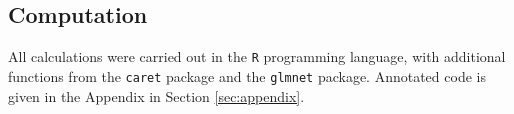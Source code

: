 \documentclass{article}\usepackage[]{graphicx}\usepackage[]{color}
\begin{document}
                                                                                                                                                                                                                                                                                                                                                                                                                                                                                                                                                                                                \subsection{Computation}
All calculations were carried out in the \texttt{R} programming language, with additional functions from the \texttt{caret} package and the \texttt{glmnet} package. Annotated code is given in the Appendix in Section \ref{sec:appendix}.
\end{document}
